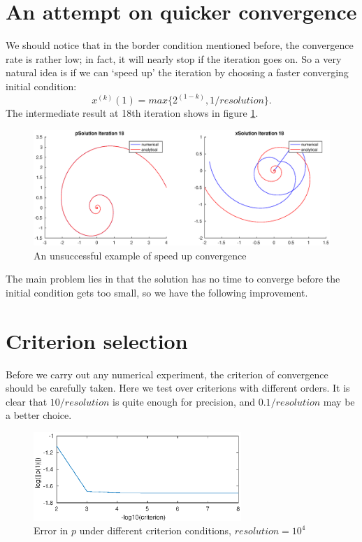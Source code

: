 \documentclass[a4paper]{article}
\begin{document}
\section{An attempt on quicker convergence}
\label{sec:attempt-qc}
We should notice that in the border condition mentioned before, the convergence rate is rather low; in fact, it will nearly stop if the iteration goes on.
So a very natural idea is if we can `speed up' the iteration by choosing a faster converging initial condition: $$ x^{(k)}(1) = max\{2^{(1-k)}, 1/resolution\}. $$
The intermediate result at 18th iteration shows in figure \ref{fig:p3-try-quick-convergence}.
\begin{figure}[h]
	\centering
	\includegraphics[width=\textwidth]{part3-try-quick-convergence}
	\caption{An unsuccessful example of speed up convergence}
	\label{fig:p3-try-quick-convergence}
\end{figure}

The main problem lies in that the solution has no time to converge before the initial condition gets too small, so we have the following improvement.

\section{Criterion selection}
Before we carry out any numerical experiment, the criterion of convergence should be carefully taken.
Here we test over criterions with different orders.
It is clear that $10/resolution$ is quite enough for precision, and $0.1/resolution$ may be a better choice.
\begin{figure}[h]
	\centering
	\includegraphics[width=0.7\textwidth]{part3-error-with-criterion}
	\caption{Error in $p$ under different criterion conditions, $resolution = 10^4$}
	\label{fig:p3-error-with-criterion}
\end{figure}
\end{document}

